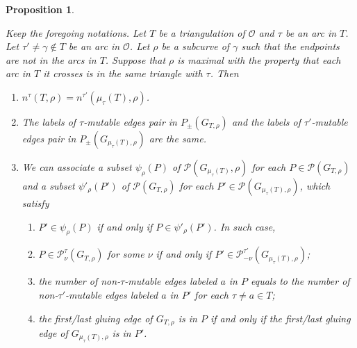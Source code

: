 \documentclass[10pt]{amsart}
\theoremstyle{theorems}
\newtheorem{Proposition}[Theorem]{Proposition}
\begin{document}
\begin{Proposition}\label{compare-loc}

Keep the foregoing notations. Let $T$ be a triangulation of $\mathcal O$ and $\tau$ be an arc in $T$. Let $\tau'\neq\gamma\notin T$ be an arc in $\mathcal O$. Let $\rho$ be a subcurve of $\gamma$ such that the endpoints are not in the arcs in $T$. Suppose that $\rho$ is maximal with the property that each arc in $T$ it crosses is in the same triangle with $\tau$. Then

\begin{enumerate}[$(1)$]

  \item $n^{\tau}(T,\rho)=n^{\tau'}(\mu_{\tau}(T),\rho)$.

  \item The labels of $\tau$-mutable edges pair in $P_{\pm}(G_{T,\rho})$ and the labels of $\tau'$-mutable edges pair in $P_{\pm}(G_{\mu_{\tau}(T),\rho})$ are the same.

  \item We can associate a subset $\psi_{\rho}(P)$ of $\mathcal P(G_{\mu_{\tau}(T)},\rho)$ for each $P\in \mathcal P(G_{T,\rho})$ and a subset $\psi'_{\rho}(P')$ of $\mathcal P(G_{T,\rho})$ for each $P'\in \mathcal P(G_{\mu_{\tau}(T),\rho})$, which satisfy

      \begin{enumerate}[$(a)$]

        \item $P'\in \psi_{\rho}(P)$ if and only if $P\in \psi'_{\rho}(P')$. In such case,

        \item $P\in \mathcal P^{\tau}_\nu(G_{T,\rho})$ for some $\nu$ if and only if $P'\in \mathcal P^{\tau'}_{-\nu}(G_{\mu_{\tau}(T),\rho})$;

        \item the number of non-$\tau$-mutable edges labeled $a$ in $P$ equals to the number of non-$\tau'$-mutable edges labeled $a$ in $P'$ for each $\tau\neq a\in T$;

        \item the first/last gluing edge of $G_{T,\rho}$ is in $P$ if and only if the first/last gluing edge of $G_{\mu_{\tau}(T),\rho}$ is in $P'$.

     \end{enumerate}

\end{enumerate}

\end{Proposition}
\end{document}
